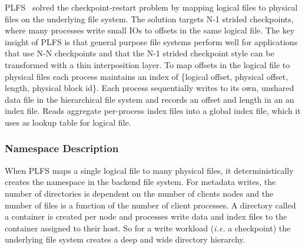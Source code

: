 

PLFS~\cite{bent_plfs_2009} solved the checkpoint-restart problem by mapping
logical files to physical files on the underlying file system. The solution
targets N-1 strided checkpoints, where many processes write small IOs to
offsets in the same logical file. The key insight of PLFS is that general
purpose file systems perform well for applications that use N-N checkpoints and
that the N-1 strided checkpoint style can be transformed with a thin
interposition layer. To map offsets in the logical file to physical files each
process maintains an index of \{logical offset, physical offset, length,
physical block id\}.  Each process sequentially writes to its own, unshared
data file in the hierarchical file system and records an offset and length in
an an index file. Reads aggregate per-process index files into a global index
file, which it uses as lookup table for logical file. 

\subsubsection{Namespace Description}

When PLFS maps a single logical file to many physical files, it
deterministically creates the namespace in the backend file system.  For
metadata writes, the number of directories is dependent on the number of
clients nodes and the number of files is a function of the number of client
processes.  A directory called a container is created per node and processes
write data and index files to the container assigned to their host.  So for a
write workload ({\it i.e.} a checkpoint) the underlying file system creates a
deep and wide directory hierarchy.

